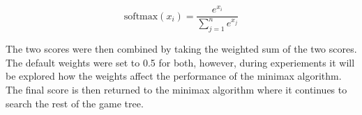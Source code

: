 \begin{equation}
    \label{eq:softmax}
    \text{softmax}(x_i) = \frac{e^{x_i}}{\sum_{j=1}^{n} e^{x_j}}
\end{equation}


The two scores were then combined by taking the weighted sum of the two scores. The default weights were set to 0.5 for both, however, during experiements it will be explored how the weights affect the performance of the minimax algorithm. The final score is then returned to the minimax algorithm where it continues to search the rest of the game tree.









